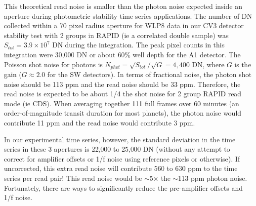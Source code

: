 \documentclass[]{aastex62}
\begin{document}
This theoretical read noise is smaller than the photon noise expected inside an aperture during photometric stability time series applications.
The number of DN collected within a 70 pixel radius aperture for WLP8 data in our CV3 detector stability test with 2 groups in RAPID (ie a correlated double sample) was $S_{tot}=3.9\times 10^7$ DN during the integration.
The peak pixel counts in this integration were 30,000 DN or about 60\% well depth for the A1 detector.
The Poisson shot noise for photons is $N_{phot} = \sqrt{S_{tot}} / \sqrt{G} = 4,400$ DN, where $G$ is the gain ($G \approx 2.0$ for the SW detectors).
In terms of fractional noise, the photon shot noise should be 113 ppm and the read noise should be 33 ppm.
Therefore, the read noise is expected to be about 1/4 the shot noise for 2 group RAPID read mode (ie CDS).
When averaging together 111 full frames over 60 minutes (an order-of-magnitude transit duration for most planets), the photon noise would contribute 11 ppm and the read noise would contribute 3 ppm.

In our experimental time series, however, the standard deviation in the time series in these 3 apertures is 22,000 to 25,000 DN (without any attempt to correct for amplifier offsets or 1/f noise using reference pixels or otherwise).
If uncorrected, this extra read noise will contribute 560 to 630 ppm to the time series per read pair!
This read noise would be $\sim$5$\times$ the $\sim$113 ppm photon noise.
Fortunately, there are ways to significantly reduce the pre-amplifier offsets and 1/f noise.
\end{document}
